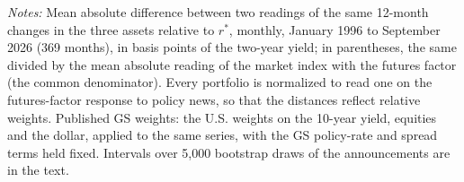 \begin{table}[tbp]\centering
\caption{How Far Apart Are the Four Readings?}\label{tab:dist}
\begin{flushleft}\footnotesize\textit{Notes:} Mean absolute difference between two readings of the same 12-month changes in the three assets relative to $r^*$, monthly, January 1996 to September 2026 (369 months), in basis points of the two-year yield; in parentheses, the same divided by the mean absolute reading of the market index with the futures factor (the common denominator). Every portfolio is normalized to read one on the futures-factor response to policy news, so that the distances reflect relative weights. Published GS weights: the U.S. weights on the 10-year yield, equities and the dollar, applied to the same series, with the GS policy-rate and spread terms held fixed. Intervals over 5,000 bootstrap draws of the announcements are in the text.\end{flushleft}
\end{table}
